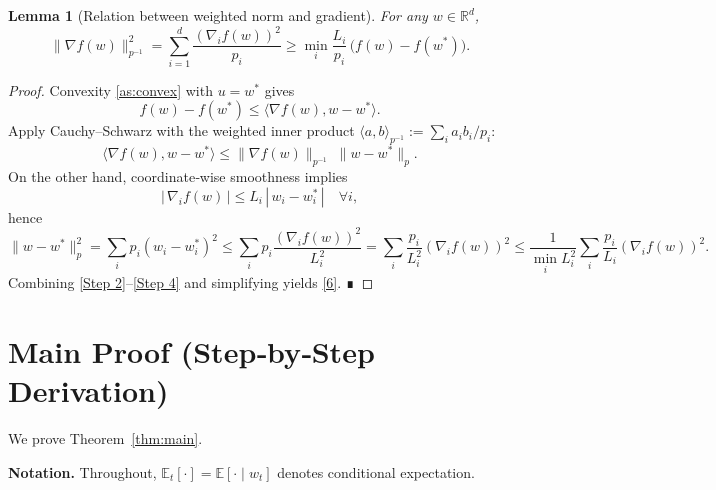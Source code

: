 \documentclass{article}
\newtheorem{lemma}{Lemma}
\newcommand{\E}{\mathbb{E}}
\newcommand{\R}{\mathbb{R}}
\begin{document}
\begin{lemma}[Relation between weighted norm and gradient]\label{lem:gradnorm}
For any $w\in\R^{d}$,
\[
\| \nabla f(w) \|_{p^{-1}}^{2}
= \sum_{i=1}^{d}\frac{(\nabla_i f(w))^{2}}{p_i}
\ge \min_{i}\frac{L_i}{p_i}\,\bigl(f(w)-f(w^{*})\bigr).
\tag{6}
\]
\end{lemma}
\begin{proof}
Convexity \eqref{as:convex} with $u=w^{*}$ gives
\[
f(w)-f(w^{*})\le \langle \nabla f(w), w-w^{*}\rangle .
\tag{Step 2}
\]
Apply Cauchy–Schwarz with the weighted inner product $\langle a,b\rangle_{p^{-1}}:=\sum_i a_i b_i/p_i$:
\[
\langle \nabla f(w), w-w^{*}\rangle
\le \|\nabla f(w)\|_{p^{-1}}\;\|w-w^{*}\|_{p}.
\tag{Step 3}
\]
On the other hand, coordinate‑wise smoothness implies
\[
|\,\nabla_i f(w)\,|\le L_i\,|\,w_i-w^{*}_i\,| \quad\forall i,
\]
hence
\[
\|w-w^{*}\|_{p}^{2}=\sum_{i}p_i (w_i-w^{*}_i)^{2}
\le \sum_{i}p_i\frac{(\nabla_i f(w))^{2}}{L_i^{2}}
= \sum_{i}\frac{p_i}{L_i^{2}}(\nabla_i f(w))^{2}
\le \frac{1}{\min_i L_i^{2}}\sum_{i}\frac{p_i}{L_i}(\nabla_i f(w))^{2}.
\tag{Step 4}
\]
Combining \eqref{Step 2}–\eqref{Step 4} and simplifying yields \eqref{6}. ∎
\end{proof}

\section*{Main Proof (Step‑by‑Step Derivation)}
We prove Theorem~\ref{thm:main}.  

\noindent\textbf{Notation.} Throughout, $\E_t[\cdot]=\E[\cdot\mid w_t]$ denotes conditional expectation.
\end{document}
